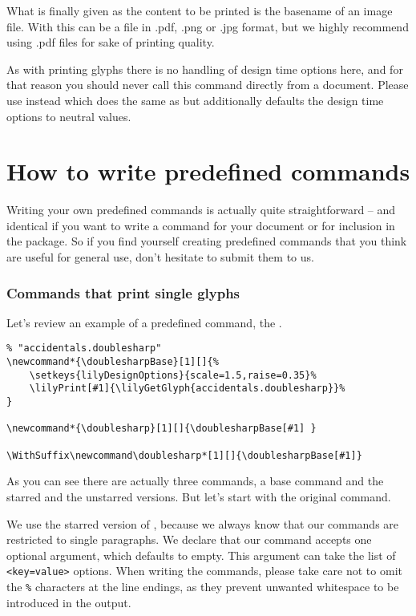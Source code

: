 \documentclass{OLLbook}
\begin{document}
What is finally given as the content to be printed is the basename of an image file.
With  this can be a file in .pdf, .png or .jpg format, but we highly recommend using .pdf files for sake of printing quality.

As with printing \emmentaler glyphs there is no handling of design time options here, and for that reason you should never call this command directly from a document.
Please use  instead which does the same as  but additionally defaults the design time options to neutral values.

\section{How to write predefined commands}
\label{sec:howto_predefined_commands}
Writing your own predefined commands is actually quite straightforward -- and identical if you want to write a command for your document or for inclusion in the package.
So if you find yourself creating predefined commands that you think are useful for general use, don't hesitate to submit them to us. 

\subsubsection{Commands that print single glyphs}
\label{subsubsec:commands_single-glyphs}
Let's review an example of a predefined command, the .

\begin{verbatim}
% "accidentals.doublesharp"
\newcommand*{\doublesharpBase}[1][]{%
    \setkeys{lilyDesignOptions}{scale=1.5,raise=0.35}%
    \lilyPrint[#1]{\lilyGetGlyph{accidentals.doublesharp}}%
}

\newcommand*{\doublesharp}[1][]{\doublesharpBase[#1] }

\WithSuffix\newcommand\doublesharp*[1][]{\doublesharpBase[#1]}
\end{verbatim}
As you can see there are actually three commands, a base command and the starred and the unstarred versions.
But let's start with the original command.

We use the starred version of , because we always know that our commands are restricted to single paragraphs.
We declare that our command accepts one optional argument, which defaults to empty. 
This argument can take the list of \texttt{<key=value>} options.
When writing the commands, please take care not to omit the \texttt{\%} characters at the line endings, as they prevent unwanted whitespace to be introduced in the output.
\end{document}
